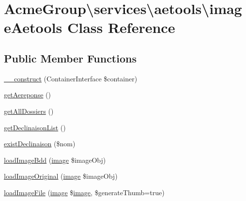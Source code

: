 \hypertarget{class_acme_group_1_1services_1_1aetools_1_1image_aetools}{\section{Acme\+Group\textbackslash{}services\textbackslash{}aetools\textbackslash{}image\+Aetools Class Reference}
\label{class_acme_group_1_1services_1_1aetools_1_1image_aetools}
}
\subsection*{Public Member Functions}
\begin{DoxyCompactItemize}
\item 
\hyperlink{class_acme_group_1_1services_1_1aetools_1_1image_aetools_a2ac187b50e52d86dbcfe1e69f371c082}{\+\_\+\+\_\+construct} (Container\+Interface \$container)
\item 
\hyperlink{class_acme_group_1_1services_1_1aetools_1_1image_aetools_a855c1368fbfa65f129ad3885dcd129c6}{get\+Aereponse} ()
\item 
\hyperlink{class_acme_group_1_1services_1_1aetools_1_1image_aetools_a0811456f83f7feeadc313b830a020d6d}{get\+All\+Dossiers} ()
\item 
\hyperlink{class_acme_group_1_1services_1_1aetools_1_1image_aetools_a8601e443cb1dc5094b8de27f697e953b}{get\+Declinaison\+List} ()
\item 
\hyperlink{class_acme_group_1_1services_1_1aetools_1_1image_aetools_ab562b0c605b23bac8441f1553b2202a8}{exist\+Declinaison} (\$nom)
\item 
\hyperlink{class_acme_group_1_1services_1_1aetools_1_1image_aetools_a48081c5044b742e96d79d9e6166a2a3d}{load\+Image\+Bdd} (\hyperlink{class_acme_group_1_1_labo_bundle_1_1_entity_1_1image}{image} \$image\+Obj)
\item 
\hyperlink{class_acme_group_1_1services_1_1aetools_1_1image_aetools_abc03eb86e26ef29ce1e5dc5fa4aa0c21}{load\+Image\+Original} (\hyperlink{class_acme_group_1_1_labo_bundle_1_1_entity_1_1image}{image} \$image\+Obj)
\item 
\hyperlink{class_acme_group_1_1services_1_1aetools_1_1image_aetools_acc6b78d750f2278ed08f75bb677c5129}{load\+Image\+File} (\hyperlink{class_acme_group_1_1_labo_bundle_1_1_entity_1_1image}{image} \$\hyperlink{class_acme_group_1_1_labo_bundle_1_1_entity_1_1image}{image}, \$generate\+Thumb=true)

\end{DoxyCompactItemize}

